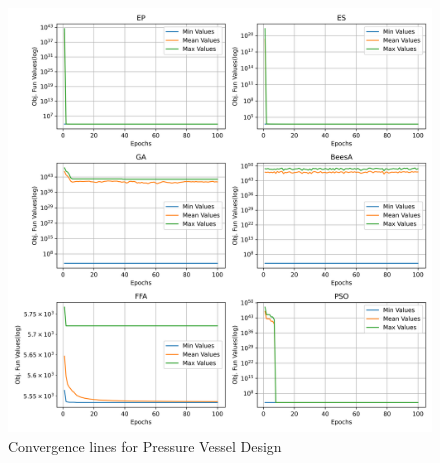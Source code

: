 
\begin{figure}[H]
\centering
\caption{Convergence lines for Pressure Vessel Design}
\label{fig:pressure_vessel_problem_convergence}
\includegraphics[width=0.4 \textwidth]{images/pressure_vessel_problem_convergence.png}
\end{figure}

